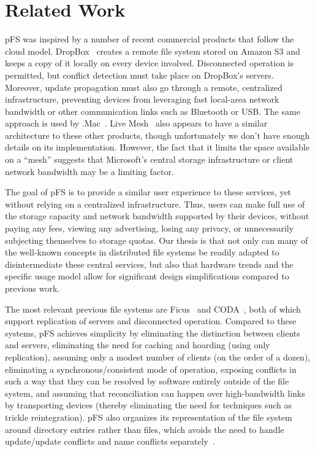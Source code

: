 
\section{Related Work}
\label{s:related}


pFS was inspired by a number of recent commercial products that follow
the cloud model.  DropBox~\cite{houston:dropbox} creates a remote file
system stored on Amazon S3 and keeps a copy of it locally on every
device involved.  Disconnected operation is permitted, but conflict
detection must take place on DropBox's servers.  Moreover, update
propagation must also go through a remote, centralized infrastructure,
preventing devices from leveraging fast local-area network bandwidth
or other communication links such as Bluetooth or USB\@.  The same
approach is used by .Mac~\cite{apple:mac}.  Live
Mesh~\cite{microsoft:livemesh} also appears to have a similar
architecture to these other products, though unfortunately we don't
have enough details on its implementation.  However, the fact that it
limits the space available on a ``mesh'' suggests that Microsoft's
central storage infrastructure or client network bandwidth may be a
limiting factor.

The goal of pFS is to provide a similar user experience to these
services, yet without relying on a centralized infrastructure.  Thus,
users can make full use of the storage capacity and network bandwidth
supported by their devices, without paying any fees, viewing any
advertising, losing any privacy, or unnecessarily subjecting
themselves to storage quotas.  Our thesis is that not only can many of the
well-known concepts in distributed file systems be readily adapted to
disintermediate these central services, but also that hardware trends and
the specific usage model allow for significant design simplifications
compared to previous work.

The most relevant previous file systems are Ficus~\cite{page:ficus}
and CODA~\cite{kistler:coda}, both of which support replication of
servers and disconnected operation.  Compared to these systems, pFS
achieves simplicity by eliminating the distinction between clients and
servers, eliminating the need for caching and hoarding (using only
replication), assuming only a modest number of clients (on the order
of a dozen), eliminating a synchronous/consistent mode of operation,
exposing conflicts in such a way that they can be resolved by software
entirely outside of the file system, and assuming that reconciliation
can happen over high-bandwidth links by transporting devices (thereby
eliminating the need for techniques such as trickle reintegration).
pFS also organizes its representation of the file system around
directory entries rather than files, which avoids the need to handle
update/update conflicts and name conflicts separately~\cite{reiher:resolving}.

